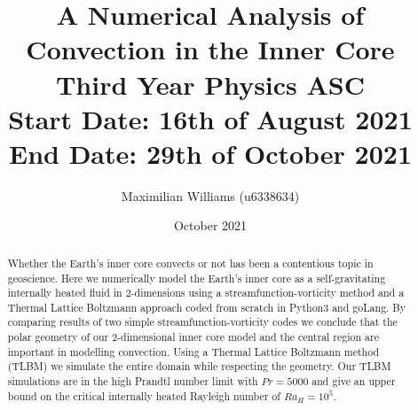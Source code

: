 \documentclass{article}
\title{%
  A Numerical Analysis of Convection in the Inner Core \\
  \large Third Year Physics ASC  \\
    Start Date: 16th of August 2021 End Date: 29th of October 2021}
\author{Maximilian Williams (u6338634)}
\date{October 2021}
\begin{document}
\maketitle

\begin{abstract}

	\noindent Whether the Earth's inner core convects or not has been a contentious topic 
	in geoscience. Here we numerically model the Earth's inner core as a self-gravitating 
	internally heated fluid 
	in 2-dimensions using a streamfunction-vorticity method and a Thermal Lattice Boltzmann 
	approach coded from scratch in Python3 and goLang. By 
	comparing results of two simple 
	streamfunction-vorticity codes we conclude that the polar geometry of our 2-dimensional
	inner core model and the central region are important in 
	modelling convection. Using a Thermal Lattice Boltzmann method (TLBM) we simulate the 
	entire domain while respecting the geometry. Our TLBM simulations are in the high 
	Prandtl number limit with $Pr=5000$ and give an upper bound on the critical internally 
	heated Rayleigh number of $Ra_H = 10^5$. 
 
\end{abstract}
\end{document}
